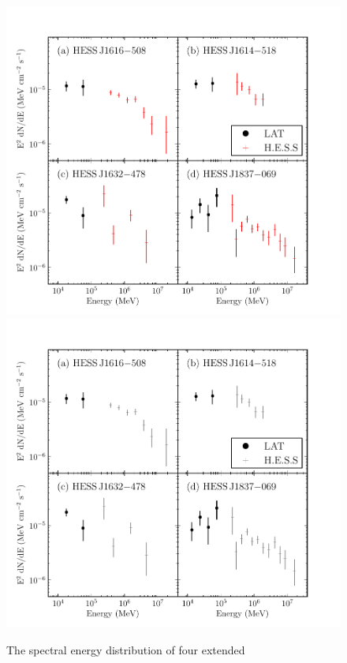 

\clearpage
\begin{figure}
    \ifcolorfigure
      \includegraphics{summary_plots/hess_seds_color.pdf}
    \else
      \includegraphics{summary_plots/hess_seds_bw.pdf}
    \fi
    \caption{
    The spectral energy distribution of four extended
}
\end{figure}
